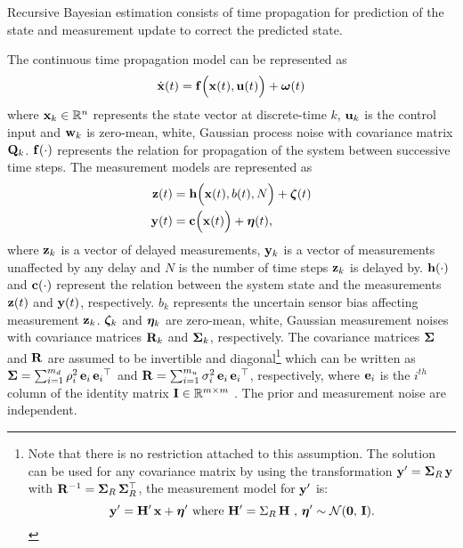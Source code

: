 

Recursive Bayesian estimation consists of time propagation for prediction of the state and measurement update to correct the predicted state.

The continuous time propagation model can be represented as
\begin{equation}
	\label{eqn:StatePropModel}
	\dot{\mathbf{x}}(t) = \mathbf{f} \Big(\mathbf{x}(t), \mathbf{u}(t) \Big) + \boldsymbol{\omega}(t)
\end{equation}
where $\mathbf{x}_k \in\mathbb{R}^n$ represents the state vector at discrete-time $k$, $\mathbf{u}_k$ is the control input and $\mathbf{w}_k$ is zero-mean, white, Gaussian process noise with covariance matrix $\mathbf{Q}_k$. $\mathbf{f} (\cdot)$ represents the relation for propagation of the system between successive time steps.
The measurement models are represented as
\begin{align} 
	\label{eqn:DelayedMeasurementModel}
	\mathbf{z}(t) &= \mathbf{h} \Big( \mathbf{x}(t), b(t),N \Big) + \boldsymbol{\zeta}(t) \\
	\label{eqn:UndelayedMeasurementModel}
	\mathbf{y}(t) &= \mathbf{c} \Big( \mathbf{x}(t) \Big) + \boldsymbol{\eta}(t),
\end{align}
where $\mathbf{z}_k$ is a vector of delayed measurements, $\mathbf{y}_k$ is a vector of measurements unaffected by any delay and $N$ is the number of time steps $\mathbf{z}_k$ is delayed by. 
$\mathbf{h}(\cdot)$ and $\mathbf{c}(\cdot)$ represent the relation between the system state and the measurements $\mathbf{z}(t)$ and $\mathbf{y}(t)$, respectively.
$b_k$ represents the uncertain sensor bias affecting measurement $\mathbf{z}_k$.
$\boldsymbol{\zeta}_k$ and $\boldsymbol{\eta}_k$ are zero-mean, white, Gaussian measurement noises with covariance matrices $\mathbf{R}_k$ and $\boldsymbol{\Sigma}_k$, respectively.
The covariance matrices $\boldsymbol{\Sigma}$ and $\mathbf{R}$ are assumed to be invertible and diagonal\footnote
{\label{ftnt:R_assumption}
	Note that there is no restriction attached to this assumption. The solution can be used for any  covariance matrix by using the transformation $\mathbf{y}' =\boldsymbol{\Sigma}_R  \, \mathbf{y}$ with $\mathbf{R}^{-1} = \boldsymbol{\Sigma}_R \, \boldsymbol{\Sigma}_R^\top$, the measurement model for $\mathbf{y}'$ is:
	$$\mathbf{y}'=\mathbf{H}' \,\mathbf{x}+\boldsymbol{\eta}' \mbox{ where } \mathbf{H}' = \Sigma_R  \, \mathbf{H} \mbox{ , } \boldsymbol{\eta}' \sim \mathcal{N}(\boldsymbol{0},\,\mathbf{I}).$$
} 
which can be written as $\boldsymbol{\Sigma} = \sum_{i=1}^{m_d} \rho_{i}^2 \, \mathbf{e}_i  \,{\mathbf{e}_i}^\top$ and $\mathbf{R} = \sum_{i=1}^{m_u} \sigma_{i}^2 \, \mathbf{e}_i  \,{\mathbf{e}_i}^\top$, respectively, where $\mathbf{e}_i$ is the $i^{th}$ column of the identity matrix $\mathbf{I} \in \mathbb{R}^{m \times m}$ .
The prior and measurement noise are independent.

